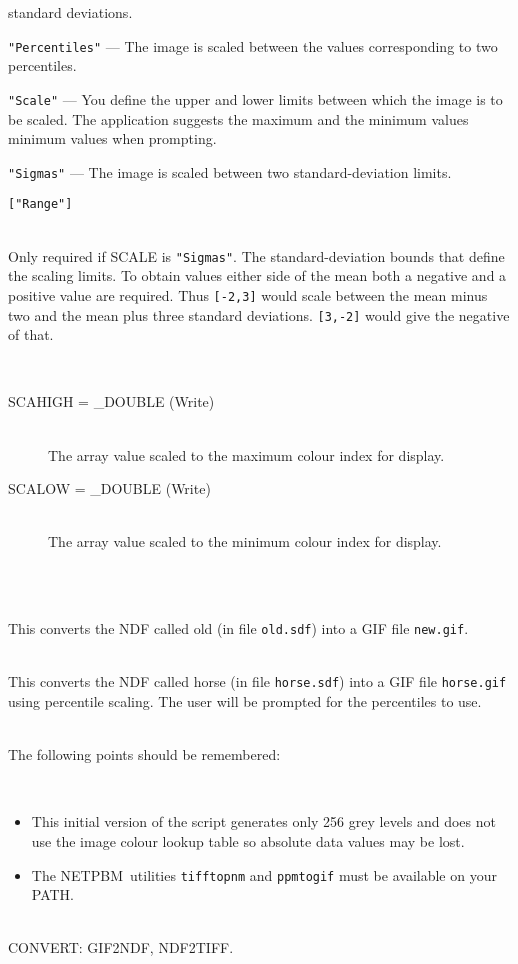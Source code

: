 \documentclass[twoside,11pt]{article}
\newcommand{\htmlref}[2]{#1}
\newcommand{\latex}[1]{#1}
\newcommand{\xref}[3]{#1}
\newcommand{\CONVERT}{{\footnotesize CONVERT}}
\newcommand{\Netpbm}{{\footnotesize NETPBM}}
\newlength{\sstexampleslength}
\newcommand{\sstresparameters}[1]{
   \goodbreak 
   \item[Results Parameters:] \mbox{} \\
   \vspace{-3.5ex}
   \begin{description}
      #1
   \end{description}
}
\newcommand{\sstexamples}[1]{
   \goodbreak
   \item[Examples:] \mbox{} \\
   \vspace{-3.5ex}
   \begin{description}
      #1
   \end{description}
}
\newcommand{\sstsubsection}[1]{ \item[{#1}] \mbox{} \\}
\newcommand{\sstexamplesubsection}[2]{\sloppy
\item[\parbox{\sstexampleslength}{\ssttt #1}] \mbox{} \vspace{0.5ex}
\\ #2 \vspace{1.0ex}}
\newcommand{\sstnotes}[1]{\pagebreak[3] \item[Notes:] \mbox{} \\[1.3ex] #1}
\newcommand{\sstdiytopic}[2]{\goodbreak \item[{\hspace{-0.35em}#1\hspace{-0.35em}:}] \mbox{} \\[1.3ex] #2}
\newcommand{\ssthitemlist}[1]{
  \latex{
  \mbox{} \\
  \vspace{-3.5ex}
  }
  \begin{itemize}
     #1
  \end{itemize}
}
\newcommand{\sstitem}{\item}
\newcommand{\sstresparameters}[1]{
      \item[\\ \xref{Results Parameters:}{sun95}{se_parout}] \\
      \begin{description}
         #1
      \end{description}
   }
\newcommand{\sstexamples}[1]{
   \item[\vspace{0.35ex}\htmlref{Examples:\vspace{-0.5ex}}{app_example}]
      \begin{description}
         #1
      \end{description}
      \\
   }
\newcommand{\sstsubsection}[1]{\item[{#1}]}
\newcommand{\sstexamplesubsection}[2]{
   \vspace{-1.0ex} \item[{\ssttt #1}] #2 \vspace{0.2ex}}
\newcommand{\sstnotes}[1]{\item[Notes:]
      \begin{description}
         #1
      \end{description}
   }
\newcommand{\sstdiytopic}[2]{\\ \item[{#1}:]
      \begin{description}
         #2
      \end{description}
   }
\newcommand{\sstitem}{\item}
\begin{document}
{\begin{description}
{{                          standard deviations.  
           \sstitem
           {\texttt{"Percentiles"}} --- The image is scaled between the values
                          corresponding to two percentiles.  
           \sstitem
           {\texttt{"Scale"}} --- You define the upper and lower limits
                          between which the image is to be scaled.  The
                          application suggests the maximum and the
                          minimum values minimum values when prompting.
           \sstitem
           {\texttt{"Sigmas"}} --- The image is scaled between two
                          standard-deviation limits.  
         }
         \texttt{["Range"]}
      }
      \sstsubsection{
        SIGMAS( 2 ) = \_REAL (Read)
      }{
        Only required if SCALE is {\texttt{"Sigmas"}}.
        The standard-deviation bounds that define the scaling limits.
        To obtain values either side of the mean both a negative and
        a positive value are required.  Thus {\texttt{[-2,3]}} would scale
        between the mean minus two and the mean plus three standard
        deviations.  {\texttt{[3,-2]}} would give the negative of that.
      }
   \end{description}
   \sstresparameters{
      \sstsubsection{
        SCAHIGH = \_DOUBLE (Write)
      }{
        The array value scaled to the maximum colour index for display.
      }
      \sstsubsection{
        SCALOW = \_DOUBLE (Write)
      }{
        The array value scaled to the minimum colour index for display.
      }
   }
   \sstexamples{
      \sstexamplesubsection{
         ndf2gif old new
      }{
         This converts the NDF called old (in file \texttt{old.sdf})
         into a GIF file \texttt{new.gif}.
      }
      \sstexamplesubsection{
         ndf2gif horse scale=pe
      }{
        This converts the NDF called horse (in file \texttt{horse.sdf})
        into a GIF file \texttt{horse.gif} using percentile scaling.
        The user will be prompted for the percentiles to use.
      }
   }
   \sstnotes{
      The following points should be remembered:
      \ssthitemlist{

         \sstitem
            This initial version of the script generates only 256 grey 
            levels and does not use the image colour lookup table so
            absolute data values may be lost.

         \sstitem
            The \Netpbm\ utilities \texttt{tifftopnm} and \texttt{ppmtogif}
            must be available on your PATH.
      }
   }
   \sstdiytopic{
      Related Applications
   }{
      \CONVERT: \htmlref{GIF2NDF}{GIF2NDF}, \htmlref{NDF2TIFF}{NDF2TIFF}.
   }
}
\end{document}
